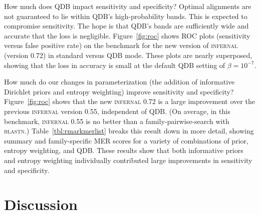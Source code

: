 \documentclass[11pt]{article}
\newif\ifdraft
\begin{document}
\ifdraft

\fi

How much does QDB impact sensitivity and specificity? Optimal
alignments are not guaranteed to lie within QDB's high-probability
bands. This is expected to compromise sensitivity. The hope is
that QDB's bands are sufficiently wide and accurate that the loss is
negligible.  Figure~\ref{fig:roc} shows ROC plots (sensitivity versus
false positive rate) on the benchmark for the new version of
\textsc{infernal} (version 0.72) in standard versus QDB mode.  These
plots are nearly superposed, showing that the loss in accuracy is
small at the default QDB setting of $\beta=10^{-7}$.

\ifdraft

\fi

How much do our changes in parameterization (the addition of
informative Dirichlet priors and entropy weighting) improve
sensitivity and specificity? Figure~\ref{fig:roc} shows that the new
\textsc{infernal} 0.72 is a large improvement over the previous
\textsc{infernal} version 0.55, independent of QDB. (On average, in
this benchmark, \textsc{infernal} 0.55 is no better than a
family-pairwise-search with \textsc{blastn}.) Table~\ref{tbl:rmarkmerlist}
breaks this result down in more detail, showing summary and
family-specific MER scores for a variety of combinations of prior,
entropy weighting, and QDB. These results show that both informative
priors and entropy weighting individually contributed large
improvements in sensitivity and specificity.

\ifdraft

\fi


\section{Discussion}
\end{document}
